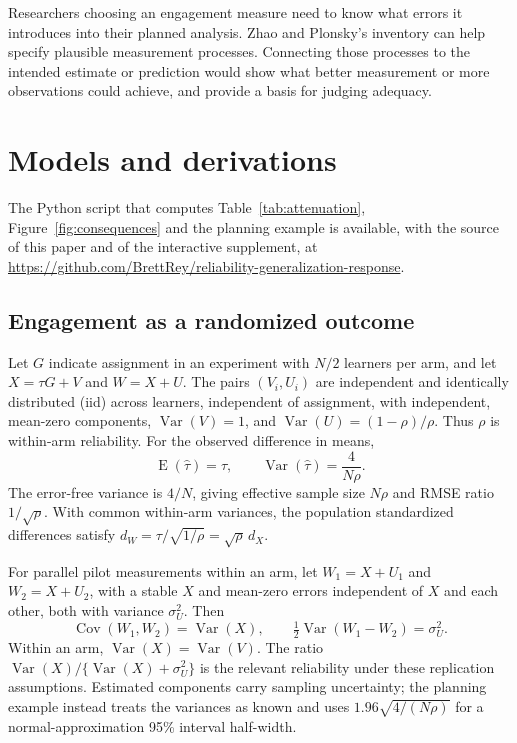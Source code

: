 \documentclass[12pt,twoside]{article}
\begin{document}
Researchers choosing an engagement measure need to know what errors it introduces into their planned analysis. Zhao and Plonsky's inventory can help specify plausible measurement processes. Connecting those processes to the intended estimate or prediction would show what better measurement or more observations could achieve, and provide a basis for judging adequacy.

\clearpage
\appendix
\section{Models and derivations}
\label{app:models}

The Python script that computes Table~\ref{tab:attenuation}, Figure~\ref{fig:consequences} and the planning example is available, with the source of this paper and of the interactive supplement, at \url{https://github.com/BrettRey/reliability-generalization-response}.

\subsection{Engagement as a randomized outcome}

Let $G$ indicate assignment in an experiment with $N/2$ learners per arm, and let $X=\tau G+V$ and $W=X+U$. The pairs $(V_i,U_i)$ are independent and identically distributed (iid) across learners, independent of assignment, with independent, mean-zero components, $\operatorname{Var}(V)=1$, and $\operatorname{Var}(U)=(1-\rho)/\rho$. Thus $\rho$ is within-arm reliability. For the observed difference in means,
\[
\operatorname{E}(\widehat\tau)=\tau,\qquad
\operatorname{Var}(\widehat\tau)=\frac{4}{N\rho}.
\]
The error-free variance is $4/N$, giving effective sample size $N\rho$ and RMSE ratio $1/\sqrt{\rho}$. With common within-arm variances, the population standardized differences satisfy $d_W=\tau/\sqrt{1/\rho}=\sqrt{\rho}\,d_X$.

For parallel pilot measurements within an arm, let $W_1=X+U_1$ and $W_2=X+U_2$, with a stable $X$ and mean-zero errors independent of $X$ and each other, both with variance $\sigma_U^2$. Then
\[
\operatorname{Cov}(W_1,W_2)=\operatorname{Var}(X),\qquad
\tfrac12\operatorname{Var}(W_1-W_2)=\sigma_U^2.
\]
Within an arm, $\operatorname{Var}(X)=\operatorname{Var}(V)$. The ratio $\operatorname{Var}(X)/\{\operatorname{Var}(X)+\sigma_U^2\}$ is the relevant reliability under these replication assumptions. Estimated components carry sampling uncertainty; the planning example instead treats the variances as known and uses $1.96\sqrt{4/(N\rho)}$ for a normal-approximation 95\% interval half-width.
\end{document}
